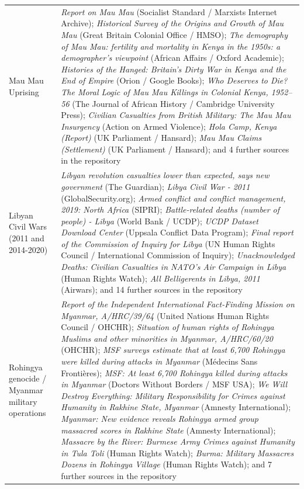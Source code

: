 \documentclass[11pt]{article}
\begin{document}
\begin{scriptsize}
\begin{longtable}{p{3.5cm} p{12.5cm}}
\addlinespace
Mau Mau Uprising & \emph{Report on Mau Mau} (Socialist Standard / Marxists Internet Archive); \emph{Historical Survey of the Origins and Growth of Mau Mau} (Great Britain Colonial Office / HMSO); \emph{The demography of Mau Mau: fertility and mortality in Kenya in the 1950s: a demographer's viewpoint} (African Affairs / Oxford Academic); \emph{Histories of the Hanged: Britain's Dirty War in Kenya and the End of Empire} (Orion / Google Books); \emph{Who Deserves to Die? The Moral Logic of Mau Mau Killings in Colonial Kenya, 1952–56} (The Journal of African History / Cambridge University Press); \emph{Civilian Casualties from British Military: The Mau Mau Insurgency} (Action on Armed Violence); \emph{Hola Camp, Kenya (Report)} (UK Parliament / Hansard); \emph{Mau Mau Claims (Settlement)} (UK Parliament / Hansard); and 4 further sources in the repository \\
\addlinespace
Libyan Civil Wars (2011 and 2014-2020) & \emph{Libyan revolution casualties lower than expected, says new government} (The Guardian); \emph{Libya Civil War - 2011} (GlobalSecurity.org); \emph{Armed conflict and conflict management, 2019: North Africa} (SIPRI); \emph{Battle-related deaths (number of people) - Libya} (World Bank / UCDP); \emph{UCDP Dataset Download Center} (Uppsala Conflict Data Program); \emph{Final report of the Commission of Inquiry for Libya} (UN Human Rights Council / International Commission of Inquiry); \emph{Unacknowledged Deaths: Civilian Casualties in NATO’s Air Campaign in Libya} (Human Rights Watch); \emph{All Belligerents in Libya, 2011} (Airwars); and 14 further sources in the repository \\
\addlinespace
Rohingya genocide / Myanmar military operations & \emph{Report of the Independent International Fact-Finding Mission on Myanmar, A/HRC/39/64} (United Nations Human Rights Council / OHCHR); \emph{Situation of human rights of Rohingya Muslims and other minorities in Myanmar, A/HRC/60/20} (OHCHR); \emph{MSF surveys estimate that at least 6,700 Rohingya were killed during attacks in Myanmar} (Médecins Sans Frontières); \emph{MSF: At least 6,700 Rohingya killed during attacks in Myanmar} (Doctors Without Borders / MSF USA); \emph{We Will Destroy Everything: Military Responsibility for Crimes against Humanity in Rakhine State, Myanmar} (Amnesty International); \emph{Myanmar: New evidence reveals Rohingya armed group massacred scores in Rakhine State} (Amnesty International); \emph{Massacre by the River: Burmese Army Crimes against Humanity in Tula Toli} (Human Rights Watch); \emph{Burma: Military Massacres Dozens in Rohingya Village} (Human Rights Watch); and 7 further sources in the repository \\

\end{longtable}
\end{scriptsize}
\end{document}
